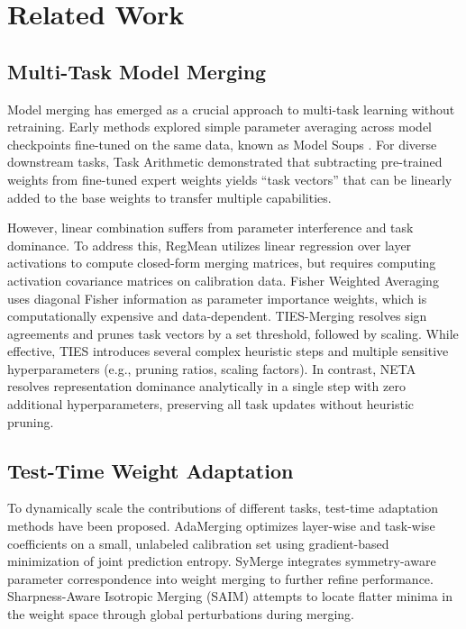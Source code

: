 \section{Related Work}
\label{sec:related}

\subsection{Multi-Task Model Merging}
Model merging has emerged as a crucial approach to multi-task learning without retraining. Early methods explored simple parameter averaging across model checkpoints fine-tuned on the same data, known as Model Soups \cite{wortsman2022model}. For diverse downstream tasks, Task Arithmetic \cite{ilharco2023editing} demonstrated that subtracting pre-trained weights from fine-tuned expert weights yields ``task vectors'' that can be linearly added to the base weights to transfer multiple capabilities. 

However, linear combination suffers from parameter interference and task dominance. To address this, RegMean \cite{jin2023regmean} utilizes linear regression over layer activations to compute closed-form merging matrices, but requires computing activation covariance matrices on calibration data. Fisher Weighted Averaging \cite{matena2021fisher, donyehiya2023fisher} uses diagonal Fisher information as parameter importance weights, which is computationally expensive and data-dependent. TIES-Merging \cite{yadav2023resolving} resolves sign agreements and prunes task vectors by a set threshold, followed by scaling. While effective, TIES introduces several complex heuristic steps and multiple sensitive hyperparameters (e.g., pruning ratios, scaling factors). In contrast, NETA resolves representation dominance analytically in a single step with zero additional hyperparameters, preserving all task updates without heuristic pruning.

\subsection{Test-Time Weight Adaptation}
To dynamically scale the contributions of different tasks, test-time adaptation methods have been proposed. AdaMerging \cite{yang2024adamerging} optimizes layer-wise and task-wise coefficients on a small, unlabeled calibration set using gradient-based minimization of joint prediction entropy. SyMerge \cite{yu2023symerge} integrates symmetry-aware parameter correspondence into weight merging to further refine performance. Sharpness-Aware Isotropic Merging (SAIM) \cite{jordon2024saim} attempts to locate flatter minima in the weight space through global perturbations during merging. 

